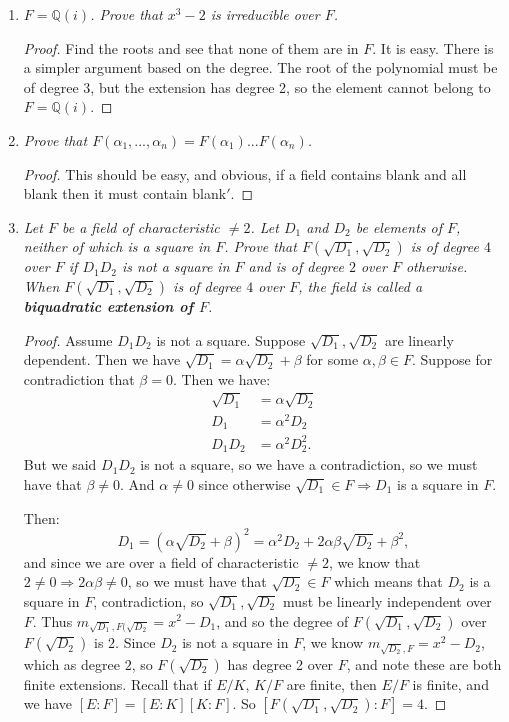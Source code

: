 \documentclass[9pt,reqno,twoside]{amsbook}
\theoremstyle{plain}
\numberwithin{section}{chapter}
\numberwithin{equation}{chapter}
\theoremstyle{definition}
\theoremstyle{remark}
\theoremstyle{plain}
\newcommand{\Q}{\mathbb{Q}}
\newcommand{\bee}{\begin{equation}\begin{aligned}}
\newcommand{\eee}{\end{aligned}\end{equation}}
\begin{document}
\begin{enumerate}[label=\arabic*.]
\item \textit{$F = \Q(i)$. Prove that $x^3 - 2$ is irreducible over $F$. }

\begin{proof}
Find the roots and see that none of them are in $F$. It is easy. There is a simpler argument based on the degree. The root of the polynomial must be of degree 3, but the extension has degree 2, so the element cannot belong to $F = \Q(i)$. 
\end{proof}






\setcounter{enumi}{5}
\item \textit{Prove that $F(\alpha_1,...,\alpha_n) = F(\alpha_1)...F(\alpha_n)$. }

\begin{proof}
This should be easy, and obvious, if a field contains blank and all blank then it must contain blank$'$.
\end{proof}


\setcounter{enumi}{7}

\item \textit{Let $F$ be a field of characteristic $\neq 2$. Let $D_1$ and $D_2$ be elements of $F$, neither of which is a square in $F$. Prove that $F(\sqrt{D_1},\sqrt{D_2})$ is of degree $4$ over $F$ if $D_1D_2$ is not a square in $F$ and is of degree $2$ over $F$ otherwise. When $F(\sqrt{D_1},\sqrt{D_2})$ is of degree $4$ over $F$, the field is called a \textbf{biquadratic extension of $F$}. }

\begin{proof}
Assume $D_1D_2$ is not a square. Suppose $\sqrt{D_1},\sqrt{D_2}$ are linearly dependent. Then we have $\sqrt{D_1} = \alpha\sqrt{ D_2} + \beta$ for some $\alpha,\beta \in F$. Suppose for contradiction that $\beta = 0$. Then we have:
\bee
\sqrt{D_1} &= \alpha \sqrt{D_2}\\
D_1 &= \alpha^2D_2\\
D_1D_2 &= \alpha^2D_2^2.
\eee
But we said $D_1D_2$ is not a square, so we have a contradiction, so we must have that $\beta \neq 0$. And $\alpha \neq 0$ since otherwise $\sqrt{D_1} \in F \Rightarrow D_1$ is a square in $F$. 

Then: 
$$
D_1 = (\alpha\sqrt{ D_2} + \beta)^2 = \alpha^2D_2 + 2\alpha\beta\sqrt{D_2} + \beta^2,
$$
and since we are over a field of characteristic $\neq 2$, we know that $2\neq 0 \Rightarrow 2\alpha\beta \neq 0$, so we must have that $\sqrt{D_2} \in F$ which means that $D_2$ is a square in $F$, contradiction, so $\sqrt{D_1},\sqrt{D_2}$ must be linearly independent over $F$. Thus $m_{\sqrt{D_1},F(\sqrt{D_2}} = x^2 - D_1$, and so the degree of $F(\sqrt{D_1},\sqrt{D_2})$ over $F(\sqrt{D_2})$ is $2$. Since $D_2$ is not a square in $F$, we know $m_{\sqrt{D_2},F} = x^2 - D_2$, which as degree $2$, so $F(\sqrt{D_2})$ has degree 2 over $F$, and note these are both finite extensions. Recall that if $E/K$, $K/F$ are finite, then $E/F$ is finite, and we have $[E:F] = [E:K][K:F]$. So $[F(\sqrt{D_1},\sqrt{D_2}):F] = 4$. 



\end{proof}
\end{enumerate}
\end{document}
